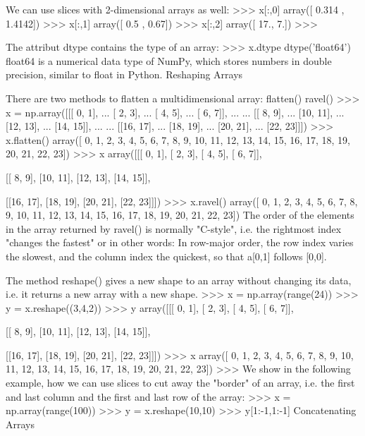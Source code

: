We can use slices with 2-dimensional arrays as well:
>>> x[:,0]
array([ 0.314 ,  1.4142])
>>> x[:,1]
array([ 0.5 ,  0.67])
>>> x[:,2]
array([ 17.,   7.])
>>> 

The attribut dtype contains the type of an array:
>>> x.dtype
dtype('float64')
float64 is a numerical data type of NumPy, which stores numbers in double precision, similar to float in Python.
Reshaping Arrays

There are two methods to flatten a multidimensional array:
flatten()
ravel()
>>> x = np.array([[[ 0,  1],
...         [ 2,  3],
...         [ 4,  5],
...         [ 6,  7]],
... 
...        [[ 8,  9],
...         [10, 11],
...         [12, 13],
...         [14, 15]],
... 
...        [[16, 17],
...         [18, 19],
...         [20, 21],
...         [22, 23]]])
>>> x.flatten()
array([ 0,  1,  2,  3,  4,  5,  6,  7,  8,  9, 10, 11, 12, 13, 14, 15, 16,
       17, 18, 19, 20, 21, 22, 23])
>>> x
array([[[ 0,  1],
        [ 2,  3],
        [ 4,  5],
        [ 6,  7]],

       [[ 8,  9],
        [10, 11],
        [12, 13],
        [14, 15]],

       [[16, 17],
        [18, 19],
        [20, 21],
        [22, 23]]])
>>> x.ravel()
array([ 0,  1,  2,  3,  4,  5,  6,  7,  8,  9, 10, 11, 12, 13, 14, 15, 16,
       17, 18, 19, 20, 21, 22, 23])
The order of the elements in the array returned by ravel() is normally "C-style", i.e. the rightmost index "changes the fastest" or in other words: In row-major order, the row index varies the slowest, and the column index the quickest, so that a[0,1] follows [0,0]. 

The method reshape() gives a new shape to an array without changing its data, i.e. it returns a new array with a new shape.
>>> x = np.array(range(24))
>>> y = x.reshape((3,4,2))
>>> y
array([[[ 0,  1],
        [ 2,  3],
        [ 4,  5],
        [ 6,  7]],

       [[ 8,  9],
        [10, 11],
        [12, 13],
        [14, 15]],

       [[16, 17],
        [18, 19],
        [20, 21],
        [22, 23]]])
>>> x
array([ 0,  1,  2,  3,  4,  5,  6,  7,  8,  9, 10, 11, 12, 13, 14, 15, 16,
       17, 18, 19, 20, 21, 22, 23])
>>> 
We show in the following example, how we can use slices to cut away the "border" of an array, i.e. the first and last column and the first and last row of the array:
>>> x = np.array(range(100))
>>> y = x.reshape(10,10)
>>> y[1:-1,1:-1]
Concatenating Arrays

